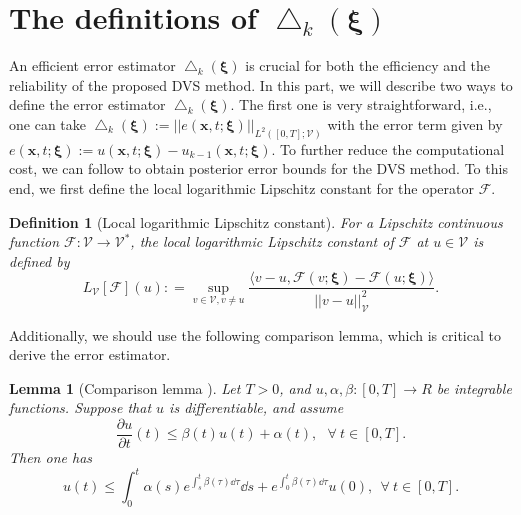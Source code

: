 \documentclass[10pt,a4paper]{article}
\newtheorem{definition}{Definition}
\newtheorem{lemma}{Lemma}
\numberwithin{equation}{section}
\numberwithin{lemma}{section}
\numberwithin{example}{section}
\numberwithin{definition}{section}
\numberwithin{assumption}{section}
\numberwithin{theorem}{section}
\numberwithin{proposition}{section}
\numberwithin{corollary}{section}
\numberwithin{remark}{section}
\begin{document}
\section{The definitions of \texorpdfstring{$\bigtriangleup_k(\bm{\xi})$}{}}
\label{sec-error}
An efficient error estimator $\bigtriangleup_k(\bm{\xi})$ is crucial for both the efficiency and the reliability of the proposed DVS method. In this part, we will describe two ways to define the error estimator $\bigtriangleup_k(\bm{\xi})$. 
The first one is very straightforward, i.e., one can take 
$\bigtriangleup_k(\bm{\xi}):=||e(\bm{x},t;\bm{\xi})||_{L^2([0,T];\mathcal{V})}$ with the error term given by 
$e(\bm{x},t;\bm{\xi}):=u(\bm{x},t;\bm{\xi})-u_{k-1}(\bm{x},t;\bm{\xi})$.
To further reduce the computational cost, we can follow \cite{Friess2017DynamicalMR,Hale1969pure, Wirtz2014a} to obtain posterior error bounds for the DVS method.
To this end, we first define the local logarithmic Lipschitz constant for the operator $\mathcal{F}$. 
\begin{definition}[Local logarithmic Lipschitz constant]
\label{def-local}
For a Lipschitz continuous function $\mathcal{F}:\mathcal{V}\to\mathcal{V^*}$, the local logarithmic Lipschitz constant of $\mathcal{F}$ at $u\in \mathcal{V}$ is defined by
$$
L_{\mathcal{V}}[\mathcal{F}](u): =
\mathop{\mathrm{sup}}\limits_{v\in \mathcal{V},v\neq u}\frac{\langle v-u,\mathcal{F}(v;\bm{\xi})-\mathcal{F}(u; \bm{\xi})\rangle}{||v-u||^2_\mathcal{V}}.
$$    
\end{definition}
 
Additionally, we should use the following comparison lemma, which is critical to derive the error estimator.
\begin{lemma}[Comparison lemma \cite{Wirtz2014a,Friess2017DynamicalMR}]
\label{lem-comparison}
Let $T>0$, and $u,\alpha,\beta:[0,T]\to R$ be integrable functions.
Suppose that $u$ is differentiable, and assume
$$
       \frac{\partial u}{\partial t}(t)\leq \beta(t) u(t)+\alpha(t),~~~\forall ~t\in[0,T].
$$
    Then one has 
$$
u(t)\leq\int_{0}^t\alpha(s)e^{\int_{s}^{t}\beta(\tau)\dd\tau} \dd s+e^{\int_{0}^{t}\beta(\tau)\dd\tau}u(0),~~\forall ~t\in [0,T].
$$
\end{lemma}
\end{document}
